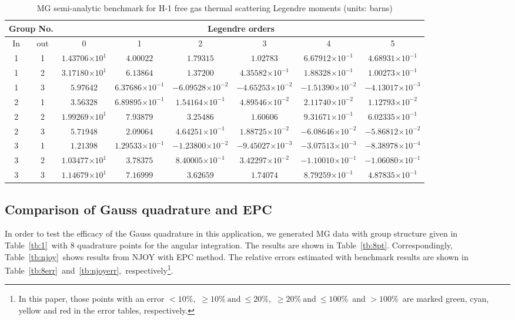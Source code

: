 \documentclass[review]{elsarticle}
\newcommand{\e}[1]{\ensuremath{\times10^{#1}}}
\begin{document}
\begin{table}[h]

\centering
\caption{MG semi-analytic benchmark for H-1 free gas thermal scattering Legendre moments (units: barns)}\normalsize
\label{tb:2}
\scriptsize
\begin{adjustwidth}{-0.5cm}{}
\begin{tabular}{|c|c|c|c|c|c|c|c|}
\hline
\multicolumn{2}{|c|}{Group No.} & \multicolumn{6}{c|}{Legendre orders}\\
\hline
In & out & 0 & 1 & 2 & 3 & 4 & 5\\ 
\hline
1 & 1 &  $1.43706\e{1}$  &  $4.00022$  &  $1.79315$  &  $1.02783$  &  $6.67912\e{-1}$  &  $4.68931\e{-1}$\\
\hline
1 & 2 &  $3.17180\e{1}$  &  $6.13864$  &  $1.37200$  &  $4.35582\e{-1}$  &  $1.88328\e{-1}$  &  $1.00273\e{-1}$\\
\hline
1 & 3 &  $5.97642$  &  $6.37686\e{-1}$  &  $-6.09528\e{-2}$  &  $-4.65253\e{-2}$  &  $-1.51390\e{-2}$  &  $-4.13017\e{-3}$\\
\hline
2 & 1 &  $3.56328$  &  $6.89895\e{-1}$  &  $1.54164\e{-1}$  &  $4.89546\e{-2}$  &  $2.11740\e{-2}$  &  $1.12793\e{-2}$\\
\hline
2 & 2 &  $1.99269\e{1}$  &  $7.93879$  &  $3.25486$  &  $1.60606$  &  $9.31671\e{-1}$  &  $6.02335\e{-1}$\\
\hline
2 & 3 &  $5.71948$  &  $2.09064$  &  $4.64251\e{-1}$  &  $1.88725\e{-2}$  &  $-6.08646\e{-2}$  &  $-5.86812\e{-2}$\\
\hline
3 & 1 &  $1.21398$  &  $1.29533\e{-1}$  &  $-1.23800\e{-2}$  &  $-9.45027\e{-3}$  &  $-3.07513\e{-3}$  &  $-8.38978\e{-4}$\\
\hline
3 & 2 &  $1.03477\e{1}$  &  $3.78375$  &  $8.40005\e{-1}$  &  $3.42297\e{-2}$  &  $-1.10010\e{-1}$  &  $-1.06080\e{-1}$\\
\hline
3 & 3 &  $1.14679\e{1}$  &  $7.16999$  &  $3.62659$  &  $1.74074$  &  $8.79259\e{-1}$  &  $4.87835\e{-1}$\\
\hline
\end{tabular}
\end{adjustwidth}
\end{table}
\subsection{Comparison of Gauss quadrature and EPC}
In order to test the efficacy of the Gauss quadrature in this application, we generated MG data with group structure given in Table~\ref{tb:1}~with 8 quadrature points for the angular integration. The results are shown in Table~\ref{tb:8pt}. Correspondingly, Table~\ref{tb:njoy}~shows results from NJOY with EPC method. The relative errors estimated with benchmark results are shown in Table~\ref{tb:8err}~and~\ref{tb:njoyerr},~respectively\footnote{In this paper, those points with an error $<10\%$,~$\geq10\%\mathrm{~and~}\leq20\%$,~$\geq20\%\mathrm{~and~}\leq100\%$~and $>100\%$~are marked green, cyan, yellow and red in the error tables, respectively.}.
\end{document}
